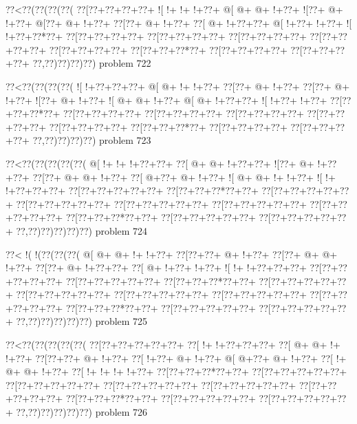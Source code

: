 \vbox{\vbox{\goo
\0??<\0??(\0??(\0??(\0??(
\0??[\0??+\0??+\0??+\0??+
\- ![\- !+\- !+\- !+\0??+
\- @[\- @+\- @+\- !+\0??+
\- ![\0??+\- @+\- !+\0??+
\- @[\0??+\- @+\- !+\0??+
\0??[\0??+\- @+\- !+\0??+
\0??[\- @+\- !+\0??+\0??+
\- @[\- !+\0??+\- !+\0??+
\- ![\- !+\0??+\0??*\0??+
\0??[\0??+\0??+\0??+\0??+
\0??[\0??+\0??+\0??+\0??+
\0??[\0??+\0??+\0??+\0??+
\0??[\0??+\0??+\0??+\0??+
\0??[\0??+\0??+\0??+\0??+
\0??[\0??+\0??+\0??*\0??+
\0??[\0??+\0??+\0??+\0??+
\0??[\0??+\0??+\0??+\0??+
\0??,\0??)\0??)\0??)\0??)
}
\hfil problem 722\hfil\break
}

\vbox{\vbox{\goo
\0??<\0??(\0??(\0??(\0??(
\- ![\- !+\0??+\0??+\0??+
\- @[\- @+\- !+\- !+\0??+
\0??[\0??+\- @+\- !+\0??+
\0??[\0??+\- @+\- !+\0??+
\- ![\0??+\- @+\- !+\0??+
\- ![\- @+\- @+\- !+\0??+
\- @[\- @+\- !+\0??+\0??+
\- ![\- !+\0??+\- !+\0??+
\0??[\0??+\0??+\0??*\0??+
\0??[\0??+\0??+\0??+\0??+
\0??[\0??+\0??+\0??+\0??+
\0??[\0??+\0??+\0??+\0??+
\0??[\0??+\0??+\0??+\0??+
\0??[\0??+\0??+\0??+\0??+
\0??[\0??+\0??+\0??*\0??+
\0??[\0??+\0??+\0??+\0??+
\0??[\0??+\0??+\0??+\0??+
\0??,\0??)\0??)\0??)\0??)
}
\hfil problem 723\hfil\break
}

\vbox{\vbox{\goo
\0??<\0??(\0??(\0??(\0??(\0??(
\- @[\- !+\- !+\- !+\0??+\0??+
\0??[\- @+\- @+\- !+\0??+\0??+
\- ![\0??+\- @+\- !+\0??+\0??+
\0??[\0??+\- @+\- @+\- !+\0??+
\0??[\- @+\0??+\- @+\- !+\0??+
\- ![\- @+\- @+\- !+\- !+\0??+
\- ![\- !+\- !+\0??+\0??+\0??+
\0??[\0??+\0??+\0??+\0??+\0??+
\0??[\0??+\0??+\0??*\0??+\0??+
\0??[\0??+\0??+\0??+\0??+\0??+
\0??[\0??+\0??+\0??+\0??+\0??+
\0??[\0??+\0??+\0??+\0??+\0??+
\0??[\0??+\0??+\0??+\0??+\0??+
\0??[\0??+\0??+\0??+\0??+\0??+
\0??[\0??+\0??+\0??*\0??+\0??+
\0??[\0??+\0??+\0??+\0??+\0??+
\0??[\0??+\0??+\0??+\0??+\0??+
\0??,\0??)\0??)\0??)\0??)\0??)
}
\hfil problem 724\hfil\break
}

\vbox{\vbox{\goo
\0??<\- !(\- !(\0??(\0??(\0??(
\- @[\- @+\- @+\- !+\- !+\0??+
\0??[\0??+\0??+\- @+\- !+\0??+
\0??[\0??+\- @+\- @+\- !+\0??+
\0??[\0??+\- @+\- !+\0??+\0??+
\0??[\- @+\- !+\0??+\- !+\0??+
\- ![\- !+\- !+\0??+\0??+\0??+
\0??[\0??+\0??+\0??+\0??+\0??+
\0??[\0??+\0??+\0??+\0??+\0??+
\0??[\0??+\0??+\0??*\0??+\0??+
\0??[\0??+\0??+\0??+\0??+\0??+
\0??[\0??+\0??+\0??+\0??+\0??+
\0??[\0??+\0??+\0??+\0??+\0??+
\0??[\0??+\0??+\0??+\0??+\0??+
\0??[\0??+\0??+\0??+\0??+\0??+
\0??[\0??+\0??+\0??*\0??+\0??+
\0??[\0??+\0??+\0??+\0??+\0??+
\0??[\0??+\0??+\0??+\0??+\0??+
\0??,\0??)\0??)\0??)\0??)\0??)
}
\hfil problem 725\hfil\break
}

\vbox{\vbox{\goo
\0??<\0??(\0??(\0??(\0??(\0??(
\0??[\0??+\0??+\0??+\0??+\0??+
\0??[\- !+\- !+\0??+\0??+\0??+
\0??[\- @+\- @+\- !+\- !+\0??+
\0??[\0??+\0??+\- @+\- !+\0??+
\0??[\- !+\0??+\- @+\- !+\0??+
\- @[\- @+\0??+\- @+\- !+\0??+
\0??[\- !+\- @+\- @+\- !+\0??+
\0??[\- !+\- !+\- !+\- !+\0??+
\0??[\0??+\0??+\0??*\0??+\0??+
\0??[\0??+\0??+\0??+\0??+\0??+
\0??[\0??+\0??+\0??+\0??+\0??+
\0??[\0??+\0??+\0??+\0??+\0??+
\0??[\0??+\0??+\0??+\0??+\0??+
\0??[\0??+\0??+\0??+\0??+\0??+
\0??[\0??+\0??+\0??*\0??+\0??+
\0??[\0??+\0??+\0??+\0??+\0??+
\0??[\0??+\0??+\0??+\0??+\0??+
\0??,\0??)\0??)\0??)\0??)\0??)
}
\hfil problem 726\hfil\break
}


